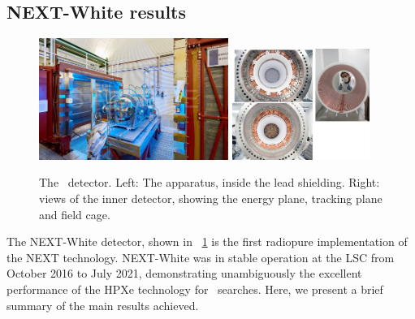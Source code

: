 \subsection{NEXT-White results}
\label{sec.new}

\begin{figure}
  \begin{center}
    \includegraphics[width=0.55\textwidth]{img2/NEW.jpg}
    \includegraphics[width=0.40\textwidth]{img2/NEW2.jpg}
    \caption{The \NEW\ detector. Left: The apparatus, inside the lead shielding. Right: views of the inner detector, showing the energy plane, tracking plane and field cage.} 
    \label{fig:newd}
  \end{center}
\end{figure}


The NEXT-White detector, shown in \fig\ \ref{fig:newd} is the first radiopure implementation of the NEXT technology. NEXT-White \cite{NEXT:2018rgj} was in stable operation at the LSC from October 2016 to July 2021, demonstrating unambiguously the excellent performance of the HPXe technology for \bbonu\ searches. Here, we present a brief summary of the main results achieved. 


